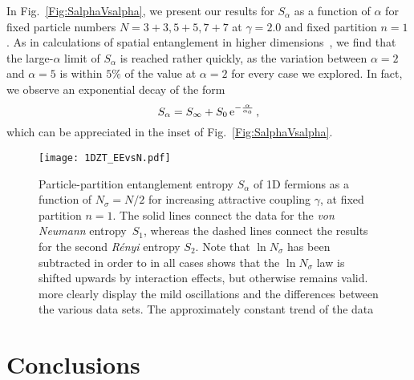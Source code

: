 \documentclass[pra,aps,groupedaddress,floatfix,twocolumn,superscriptaddress,showpacs,nofootinbib]{revtex4-1}
\newcommand{\beq}{\begin{equation}}
\newcommand{\eeq}{\end{equation}}
\begin{document}
{In Fig.~\ref{Fig:SalphaVsalpha}, we present our results} for $S_\alpha$ as a function of $\alpha$ for fixed particle numbers
$N=3+3,5+5,7+7$ at $\gamma=2.0$ and fixed partition $n=1$. As in calculations of spatial entanglement in higher dimensions~\cite{UFGEE}, we
find that the large-$\alpha$ limit of $S_\alpha$ is reached rather quickly, as the variation between $\alpha=2$ and $\alpha=5$ is within $5\%$ of
the value at $\alpha=2$ for every case we explored. {In fact,
we observe an exponential decay of the {form
%
\beq
S_\alpha = S_\infty + S_0\, {\rm e}^{-\frac{\alpha}{\alpha_0}}\,,
\eeq
%
which} can be appreciated in the inset of Fig.~\ref{Fig:SalphaVsalpha}.}
%
\begin{figure}[t]
\texttt{[image: 1DZT\_EEvsN.pdf]}
 \caption{\label{Fig:Salpha} Particle-partition entanglement entropy $S_\alpha$ of 1D fermions
 {as a function of $N_{\sigma}=N/2$
 for} increasing attractive coupling $\gamma$, at fixed partition $n=1$. The solid lines connect the data for {the {\it von Neumann} entropy~$S_1$},
 whereas the dashed lines connect the results for the second {{\it R{\'e}nyi}} entropy $S_2$. Note that $\ln N_{\sigma}$ has been subtracted in order to
 in all cases shows that the $\ln N_{\sigma}$ law is shifted upwards by interaction effects, but otherwise remains valid.
 more clearly display the mild oscillations and the differences between the various data sets. The approximately constant trend of the data
 }
\end{figure}
%

\section{Conclusions}
\end{document}
